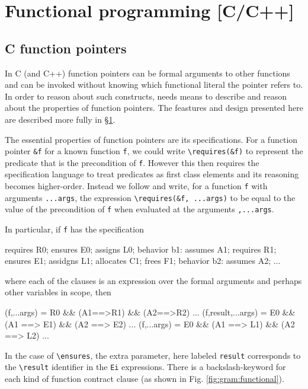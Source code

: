 \section{Functional programming [C/C++]}
\label{sec:functional}

\experimental

\subsection{C function pointers}

In C (and C++) function pointers can be formal arguments to other functions and can be invoked without knowing which functional literal the pointer refers to.
In order to reason about such constructs, \NAME needs means to describe and reason about the properties of function pointers. The feastures and design presented here are
described more fully in \S\ref{sec:functional}.

The essential properties of function pointers are its specifications. For a function pointer \lstinline|&f| for a known function \lstinline|f|,  we could write \lstinline|\requires(&f)| to represent the predicate that is the precondition of \lstinline|f|. However this then requires the specification language to treat predicates as first class elements and its reasoning becomes higher-order. Instead we follow \cite{20.500.11850/153152} and write, for a function \lstinline|f| with arguments \lstinline|...args|, the expression \lstinline|\requires(&f, ...args)| to be equal to the  value of
the precondition of \lstinline|f| when evaluated at the arguments \lstinline|,...args|.

In particular, if \lstinline|f| has the specification
\begin{listing-nonumber}
requires R0;
ensures E0;
assigns L0;
behavior b1:
  assumes A1;
  requires R1;
  ensures E1;
  assidgns L1;
  allocates C1;
  frees F1;
behavior b2:
  assumes A2;
  ...
\end{listing-nonumber}
where each of the clauses is an expression over the formal arguments and perhaps other variables in scope, then

\begin{listing-nonumber}
\requires(f,...args) = R0 && (A1==>R1) && (A2==>R2) ...
\ensures(f,result,...args) = E0 && (A1 ==> E1) && (A2 ==> E2) ...
\assigns(f,...args) = E0 && (A1 ==> L1) && (A2 ==> L2) ...
\end{listing-nonumber}
In the case of \lstinline|\ensures|, the extra parameter, here labeled \lstinline|result| corresponds to the \lstinline|\result| identifier in the \lstinline|Ei| expressions.
There is a backslash-keyword for each kind of function contract clause (as shown in Fig. \ref{fig:gram:functional}).

